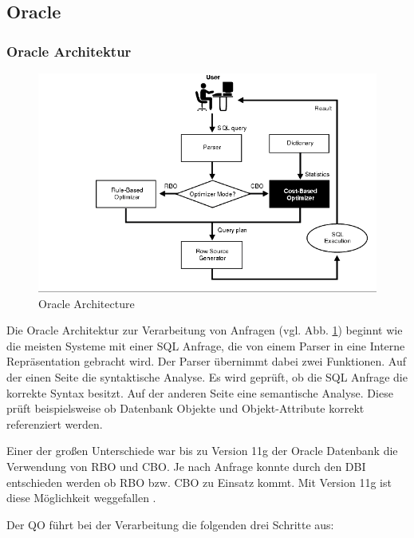 \subsection{Oracle}
\subsubsection{Oracle Architektur}


\begin{figure}[ht]
  \centering
  \includegraphics[width=\textwidth]{02_Related_Work/OracleArchitecture.png}
  \caption{Oracle Architecture \cite{Oracle2004Basics}}
  \label{OracleArchitecture}
\end{figure}


Die Oracle Architektur zur Verarbeitung von Anfragen \cite{Oracle2004Basics}  (vgl. Abb. \ref{OracleArchitecture})  beginnt wie die meisten Systeme mit einer SQL Anfrage, die von einem Parser in eine Interne Repräsentation gebracht wird. Der Parser übernimmt dabei zwei Funktionen. Auf der einen Seite die syntaktische Analyse. Es wird geprüft, ob die SQL Anfrage die korrekte Syntax besitzt. Auf der anderen Seite eine semantische Analyse. Diese prüft beispielsweise ob Datenbank Objekte und Objekt-Attribute  korrekt referenziert werden. 

Einer der großen Unterschiede war bis zu Version 11g der Oracle Datenbank die Verwendung von \ac{RBO} und \ac{CBO}. Je nach Anfrage konnte durch den \ac{DBI} entschieden werden ob \ac{RBO} bzw. \ac{CBO} zu Einsatz kommt. Mit Version 11g ist diese Möglichkeit weggefallen \cite{dba_oracle2015}. 

Der \ac{QO} führt bei der Verarbeitung die folgenden drei Schritte aus:

